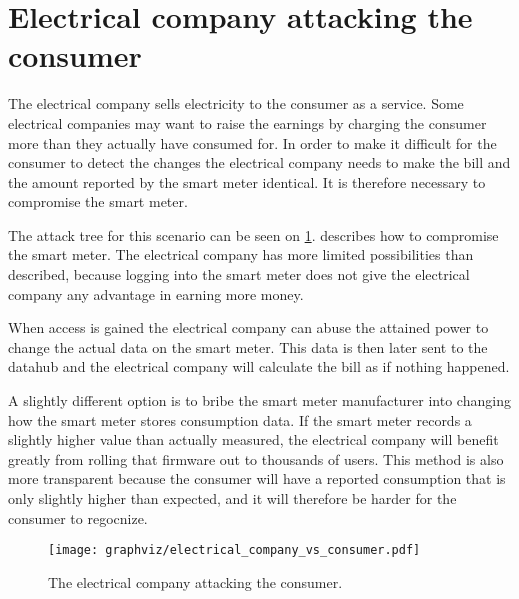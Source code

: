 \section{Electrical company attacking the consumer}
The electrical company sells electricity to the consumer as a service.
Some electrical companies may want to raise the earnings by charging the consumer more than they actually have consumed for.
In order to make it difficult for the consumer to detect the changes the electrical company needs to make the bill and the amount reported by the smart meter identical.
It is therefore necessary to compromise the smart meter.

The attack tree for this scenario can be seen on \cref{electrical_vs_consumer}.
 describes how to compromise the smart meter.
The electrical company has more limited possibilities than described, because logging into the smart meter does not give the electrical company any advantage in earning more money.

When access is gained the electrical company can abuse the attained power to change the actual data on the smart meter.
This data is then later sent to the datahub and the electrical company will calculate the bill as if nothing happened.

A slightly different option is to bribe the smart meter manufacturer into changing how the smart meter stores consumption data.
If the smart meter records a slightly higher value than actually measured, the electrical company will benefit greatly from rolling that firmware out to thousands of users.
This method is also more transparent because the consumer will have a reported consumption that is only slightly higher than expected, and it will therefore be harder for the consumer to regocnize.

\begin{figure}
  \begin{center}
    \texttt{[image: graphviz/electrical\_company\_vs\_consumer.pdf]}
  \end{center}
  \caption{The electrical company attacking the consumer.}
  \label{electrical_vs_consumer}
\end{figure}
